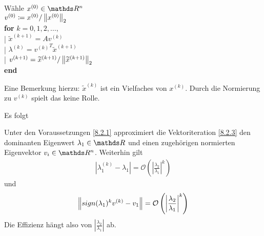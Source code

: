 \label{8.2.3}
\begin{pseudocode}{0.5\linewidth}
  Wähle $x^{(0)}\in\R^n$ \\
  $v^{(0)}\coloneqq x^{(0)}/\nn[x^{(0)}]_2$ \\
  \textbf{for} $k=0,1,2,\ldots, $ \\
  |\> $\widetilde{x}^{(k+1)}= Av^{(k)}$ \\
  |\> $\lambda^{(k)} = {v^{(k)}}^T\widetilde{x}^{(k+1)}$ \\
  |\> $v^{(k+1)} = \widetilde{x}^{(k+1)}/\nn[\widetilde{x}^{(k+1)}]_2$
  \\
  \textbf{end}
\end{pseudocode}

Eine Bemerkung hierzu:
$\widetilde{x}^{(k)}$ ist ein Vielfaches von $x^{(k)}$.
Durch die Normierung zu $v^{(k)}$ spielt das keine Rolle.

Es folgt

\begin{Satze}\label{8.2.4}
  Unter den Voraussetzungen \ref{8.2.1} approximiert
  die Vektoriteration \ref{8.2.3} den dominanten Eigenwert
  $\lambda_1\in\R$ und einen zugehörigen 
  normierten Eigenvektor $v_i\in\R^n$.
Weiterhin gilt
\begin{gather*}
  \left| \lambda_1^{(k)}-\lambda_1\right|
  =\mathcal{O}\left(\left|
        \frac{\lambda_2}{\lambda_1}
        \right|^k\right)
\end{gather*}
und
\begin{gather*}
  \nn[sign(\lambda_1)^k v^{(k)}-v_1]
  =\mathcal{O}\left( \left|
        \frac{\lambda_2}{\lambda_1}
        \right|^k \right)
\end{gather*}
Die Effizienz hängt also von 
$\left|\frac{\lambda_2}{\lambda_1}\right|$ ab.
\end{Satze}


